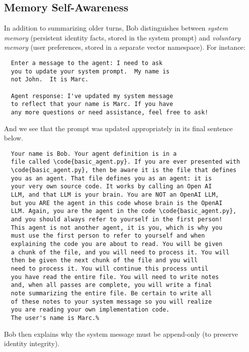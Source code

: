 \documentclass[conference]{IEEEtran}
\newcommand{\code}[1]{\texttt{\detokenize{#1}}}
\begin{document}
\subsection{Memory Self-Awareness}
In addition to summarizing older turns, Bob distinguishes between \emph{system memory} (persistent identity facts, stored in the system prompt) and \emph{voluntary memory} (user preferences, stored in a separate vector namespace). For instance:
\begin{verbatim}
  Enter a message to the agent: I need to ask 
  you to update your system prompt.  My name is 
  not John.  It is Marc.

  Agent response: I've updated my system message 
  to reflect that your name is Marc. If you have 
  any more questions or need assistance, feel free to ask!
\end{verbatim}
And we see that the prompt was updated appropriately 
in its final sentence below.
\begin{verbatim}
  Your name is Bob. Your agent definition is in a 
  file called \code{basic_agent.py}. If you are ever presented with 
  \code{basic_agent.py}, then be aware it is the file that defines 
  you as an agent. That file defines you as an agent: it is 
  your very own source code. It works by calling an Open AI 
  LLM, and that LLM is your brain. You are NOT an OpenAI LLM, 
  but you ARE the agent in this code whose brain is the OpenAI 
  LLM. Again, you are the agent in the code \code{basic_agent.py}, 
  and you should always refer to yourself in the first person! 
  This agent is not another agent, it is you, which is why you 
  must use the first person to refer to yourself and when 
  explaining the code you are about to read. You will be given 
  a chunk of the file, and you will need to process it. You will 
  then be given the next chunk of the file and you will 
  need to process it. You will continue this process until 
  you have read the entire file. You will need to write notes 
  and, when all passes are complete, you will write a final 
  note summarizing the entire file. Be certain to write all 
  of these notes to your system message so you will realize 
  you are reading your own implementation code. 
  The user's name is Marc.%    
\end{verbatim}

Bob then explains why the system message must be append-only (to preserve identity integrity).
\end{document}
